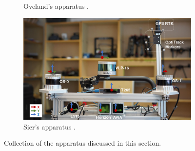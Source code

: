 \begin{figure}[H]
\begin{subfigure}{0.35\textwidth}
        \caption{Oveland's apparatus \cite{oveland_comparing_2018}.}
        \label{fig: oveland apparatus}
    \end{subfigure}
    \begin{subfigure}{0.35\textwidth}
        \includegraphics[width=\linewidth]{images/background/sier_apparatus.png}
        \caption{Sier's apparatus \cite{sier_benchmark_2022}.}
        \label{fig: sier apparatus}
    \end{subfigure}
    \caption{Collection of the apparatus discussed in this section.}
    \label{fig: all apparatus}
\end{figure}